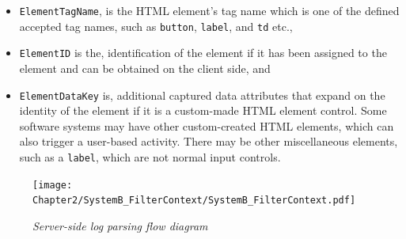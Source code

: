 \begin{itemize}
	\item \texttt{ElementTagName}, is the HTML element's tag name which is one of the defined accepted tag names, such as \texttt{button}, \texttt{label}, and \texttt{td} etc.,
	\item \texttt{ElementID} is the, identification of the element if it has been assigned to the element and can be obtained on the client side, and
	\item \texttt{ElementDataKey} is, additional captured data attributes that expand on the identity of the element if it is a custom-made HTML element control. Some software systems may have other custom-created HTML elements, which can also trigger a user-based activity. There may be other miscellaneous elements, such as a \texttt{label}, which are not normal input controls.
\end{itemize}

\clearpage

\begin{figure}[!htb]
	\centering
	\texttt{[image: Chapter2/SystemB\_FilterContext/SystemB\_FilterContext.pdf]}
	\caption[Server-side log parsing flow diagram]
	{\textit{Server-side log parsing flow diagram}}\label{fig:ch2_loggingParse}
\end{figure}

\clearpage

